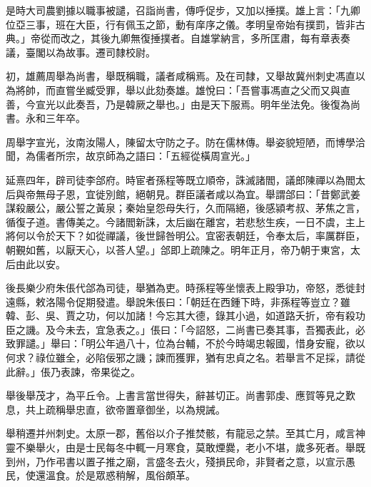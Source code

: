 \begin{pinyinscope}
是時大司農劉據以職事被譴，召詣尚書，傳呼促步，又加以捶撲。雄上言：「九卿位亞三事，班在大臣，行有佩玉之節，動有庠序之儀。孝明皇帝始有撲罰，皆非古典。」帝從而改之，其後九卿無復捶撲者。自雄掌納言，多所匡肅，每有章表奏議，臺閣以為故事。遷司隸校尉。

初，雄薦周舉為尚書，舉既稱職，議者咸稱焉。及在司隸，又舉故冀州刺史馮直以為將帥，而直嘗坐臧受罪，舉以此劾奏雄。雄悅曰：「吾嘗事馮直之父而又與直善，今宣光以此奏吾，乃是韓厥之舉也。」由是天下服焉。明年坐法免。後復為尚書。永和三年卒。

周舉字宣光，汝南汝陽人，陳留太守防之子。防在儒林傳。舉姿貌短陋，而博學洽聞，為儒者所宗，故京師為之語曰：「五經從橫周宣光。」

延熹四年，辟司徒李郃府。時宦者孫程等既立順帝，誅滅諸閻，議郎陳禪以為閻太后與帝無母子恩，宜徙別館，絕朝見。群臣議者咸以為宜。舉謂郃曰：「昔鄭武姜謀殺嚴公，嚴公誓之黃泉；秦始皇怨母失行，久而隔絕，後感潁考叔、茅焦之言，循復子道。書傳美之。今諸閻新誅，太后幽在離宮，若悲愁生疾，一日不虞，主上將何以令於天下？如從禪議，後世歸咎明公。宜密表朝廷，令奉太后，率厲群臣，朝覲如舊，以厭天心，以荅人望。」郃即上疏陳之。明年正月，帝乃朝于東宮，太后由此以安。

後長樂少府朱倀代郃為司徒，舉猶為吏。時孫程等坐懷表上殿爭功，帝怒，悉徙封遠縣，敕洛陽令促期發遣。舉說朱倀曰：「朝廷在西鍾下時，非孫程等豈立？雖韓、彭、吳、賈之功，何以加諸！今忘其大德，錄其小過，如道路夭折，帝有殺功臣之譏。及今未去，宜急表之。」倀曰：「今詔怒，二尚書已奏其事，吾獨表此，必致罪譴。」舉曰：「明公年過八十，位為台輔，不於今時竭忠報國，惜身安寵，欲以何求？祿位雖全，必陷佞邪之譏；諫而獲罪，猶有忠貞之名。若舉言不足採，請從此辭。」倀乃表諫，帝果從之。

舉後舉茂才，為平丘令。上書言當世得失，辭甚切正。尚書郭虔、應賀等見之歎息，共上疏稱舉忠直，欲帝置章御坐，以為規誡。

舉稍遷并州刺史。太原一郡，舊俗以介子推焚骸，有龍忌之禁。至其亡月，咸言神靈不樂舉火，由是士民每冬中輒一月寒食，莫敢煙爨，老小不堪，歲多死者。舉既到州，乃作弔書以置子推之廟，言盛冬去火，殘損民命，非賢者之意，以宣示愚民，使還溫食。於是眾惑稍解，風俗頗革。


\end{pinyinscope}
